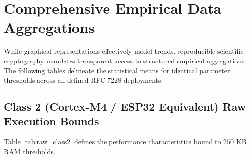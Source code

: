 \section{Comprehensive Empirical Data Aggregations}
\label{sec:data_tables}

While graphical representations effectively model trends, reproducible scientific cryptography mandates transparent access to structured empirical aggregations. The following tables delineate the statistical means for identical parameter thresholds across all defined RFC 7228 deployments.

\subsection{Class 2 (Cortex-M4 / ESP32 Equivalent) Raw Execution Bounds}

Table \ref{tab:raw_class2} defines the performance characteristics bound to $250$ KB RAM thresholds.

